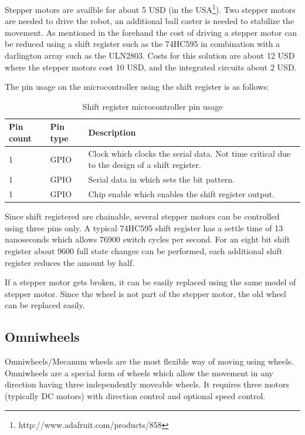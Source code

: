 Stepper motors are availble for about 5 USD (in the USA\footnote{http://www.adafruit.com/products/858}). Two stepper motors are needed to drive the robot, an additional ball caster is needed to stabilize the movement. As mentioned in the forehand the cost of driving a stepper motor can be reduced using a shift register such as the 74HC595 in combination with a darlington array such as the ULN2803. Costs for this solution are about 12 USD where the stepper motors cost 10 USD, and the integrated circuits about 2 USD.

The pin usage on the microcontroller using the shift register is as follows:

\begin{table}[H]
\centering
\begin{tabular}{p{}p{}p{}}
\toprule
Pin count & Pin type & Description \\
\midrule
1 & GPIO & Clock which clocks the serial data. Not time critical due to the design of a shift register.\\
1 & GPIO & Serial data in which sets the bit pattern.\\
1 & GPIO & Chip enable which enables the shift register output.\\
\bottomrule
\end{tabular}
\caption{Shift register microcontroller pin usage}
\label{tbl:74hc595_pin}
\end{table}

Since shift registered are chainable, several stepper motors can be controlled using three pins only. A typical 74HC595 shift register has a settle time of 13 nanoseconds which allows 76900 switch cycles per second. For an eight bit shift register about 9600 full state changes can be performed, each additional shift register reduces the amount by half.

If a stepper motor gets broken, it can be easily replaced using the same model of stepper motor. Since the wheel is not part of the stepper motor, the old wheel can be replaced easily.
\subsection{Omniwheels}
Omniwheels/Mecanum wheels are the most flexible way of moving using wheels. Omniwheels are a special form of wheels which allow the movement in any direction having three independently moveable wheels. It requires three motors (typically DC motors) with direction control and optional speed control.

